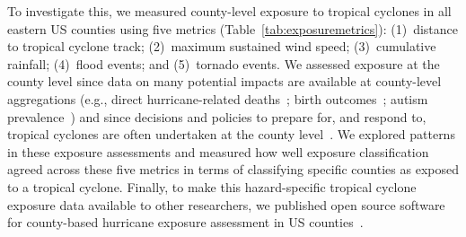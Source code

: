 To investigate this, we measured county-level exposure to tropical cyclones in
all eastern \ac{US} counties using five metrics
(Table~\ref{tab:exposuremetrics}): (1)~distance to tropical cyclone track;
(2)~maximum sustained wind speed; (3)~cumulative rainfall; (4)~flood events;
and (5)~tornado events.  We assessed exposure at the county level since data on
many potential impacts are available at county-level aggregations (e.g., direct
hurricane-related deaths~\citep{czajkowski2011}; birth
outcomes~\citep{grabich2015, grabich2016}; autism
prevalence~\citep{kinney2008}) and since decisions and policies to prepare for,
and respond to, tropical cyclones are often undertaken at the county
level~\citep{zandbergen2009, rappaport2000}.  We explored patterns in these
exposure assessments and measured how well exposure classification agreed
across these five metrics in terms of classifying specific counties as exposed
to a tropical cyclone.  Finally, to make this hazard-specific tropical cyclone
exposure data available to other researchers, we published open source software
for county-based hurricane exposure assessment in \ac{US}
counties~\citep{hurricaneexposure}.
